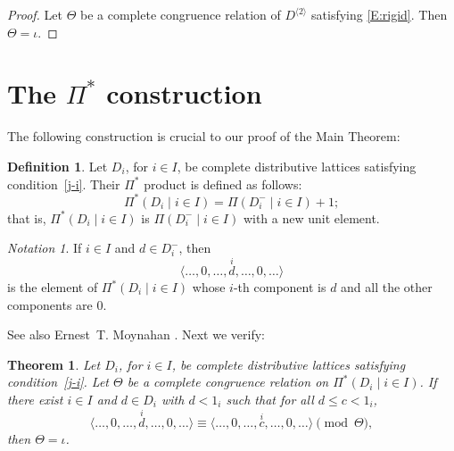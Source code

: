 \documentclass{amsart}
\theoremstyle{plain}
\newtheorem{theorem}{Theorem}
\theoremstyle{definition}
\newtheorem{definition}{Definition}
\theoremstyle{remark}
\newtheorem*{notation}{Notation}
\numberwithin{equation}{section}
\begin{document}
\begin{proof}
   Let $\Theta$ be a complete congruence relation of 
   $D^{\langle 2 \rangle}$ satisfying \eqref{E:rigid}. Then $\Theta =
\iota$. 
\end{proof}

\section{The $\Pi^{*}$ construction}\label{S:P*} 
The following construction is crucial to our proof of the Main Theorem:

\begin{definition}\label{D:P*} 
   Let $D_{i}$, for $i \in I$, be complete distributive lattices 
   satisfying condition~\eqref{j-i}.  Their $\Pi^{*}$ product is defined
as 
 follows:
   \[
      \Pi^{*} ( D_{i} \mid i \in I ) = \Pi ( D_{i}^{-} \mid i \in I ) + 1;
   \]
   that is, $\Pi^{*} ( D_{i} \mid i \in I )$ is $\Pi ( D_{i}^{-} \mid 
   i \in I )$ with a new unit element. 
\end{definition}

\begin{notation} 
   If $i \in I$ and $d \in D_{i}^{-}$, then
   \[
      \langle \dots, 0, \dots, \overset{i}{d}, \dots, 0, \dots \rangle
   \]
   is the element of $\Pi^{*} ( D_{i} \mid i \in I )$ whose $i$-th 
   component is $d$ and all the other components are $0$.
\end{notation}

See also Ernest~T. Moynahan \cite{eM57a}.  Next we verify:

\begin{theorem}\label{T:P*} 
   Let $D_{i}$, for $i \in I$, be complete distributive lattices 
   satisfying condition~\eqref{j-i}.  Let $\Theta$ be a complete
congruence
   relation on $\Pi^{*} ( D_{i} \mid i \in I )$.  If there exist  
   $i \in I$ and $d \in D_{i}$ with $d < 1_{i}$ such that for
   all $d \leq c < 1_{i}$, 
   \begin{equation}\label{E:cong1} 
      \langle \dots, 0, \dots,\overset{i}{d},
      \dots, 0, \dots \rangle \equiv \langle \dots, 0, \dots,
      \overset{i}{c}, \dots, 0, \dots \rangle \pmod{\Theta}, 
   \end{equation}
   then $\Theta = \iota$.
\end{theorem}
\end{document}
